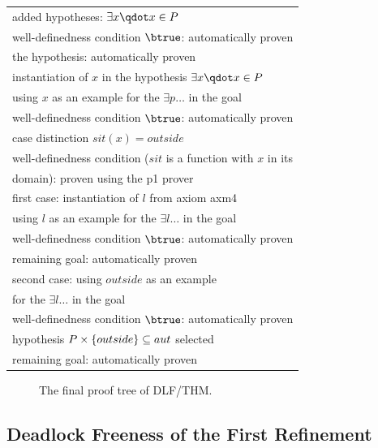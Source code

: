 \begin{tabular}{l}
  \hline
  added hypotheses: $\exists x\qdot x\in P$ \\
  \quad well-definedness condition $\btrue$: automatically proven\\
  \quad the hypothesis: automatically proven \\
  \quad instantiation of $x$ in the hypothesis $\exists x\qdot x\in P$\\
  \qquad using $x$ as an example for the $\exists p \ldots$ in the goal\\
  \quad\qquad well-definedness condition $\btrue$: automatically proven\\
  \quad\qquad case distinction $sit(x)=outside$ \\
  \qquad\qquad well-definedness condition
    ($sit$ is a function with $x$ in its \\
  \qquad\qquad\qquad\qquad\qquad\qquad domain): proven using the \textsf{p1} prover\\
  \qquad\qquad first case: instantiation of $l$ from axiom \textsf{axm4}\\
  \quad\qquad\qquad using $l$ as an example for the $\exists l \ldots$ in the goal\\
  \qquad\qquad\qquad well-definedness condition $\btrue$: automatically proven\\
  \qquad\qquad\qquad remaining goal: automatically proven\\
  \qquad\qquad second case: using $outside$ as an example \\
  \qquad\qquad\qquad\qquad\qquad\qquad for the $\exists l \ldots$ in the goal \\
  \quad\qquad\qquad well-definedness condition $\btrue$: automatically proven\\
  \quad\qquad\qquad hypothesis $P\mathbin\times\{outside\}\subseteq aut$ selected\\
  \qquad\qquad\qquad remaining goal: automatically proven\\
  \hline
\end{tabular}
\begin{figure}[!ht]
  \begin{center}
    \caption{The final proof tree of \textsf{DLF/THM}.}
    \label{fig_tut_10_final_proof_tree}
  \end{center}
\end{figure}



\subsection{Deadlock Freeness of the First Refinement}
\label{tut_location_first_refinement}

